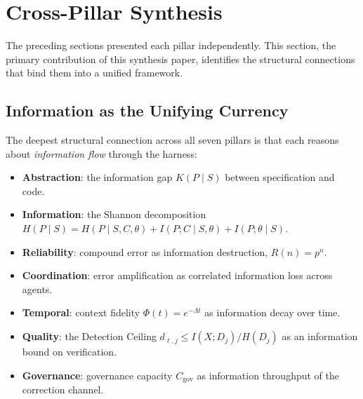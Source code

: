 

\section{Cross-Pillar Synthesis}
\label{sec:synthesis}

The preceding sections presented each pillar independently. This section, the primary contribution of this synthesis paper, identifies the structural connections that bind them into a unified framework.

\subsection{Information as the Unifying Currency}

The deepest structural connection across all seven pillars is that each reasons about \emph{information flow} through the harness:

\begin{itemize}[nosep]
    \item \textbf{Abstraction}: the information gap $K(P \mid S)$ between specification and code.
    \item \textbf{Information}: the Shannon decomposition $H(P \mid S) = H(P \mid S,C,\theta) + I(P;C \mid S,\theta) + I(P;\theta \mid S)$.
    \item \textbf{Reliability}: compound error as information destruction, $R(n) = p^n$.
    \item \textbf{Coordination}: error amplification as correlated information loss across agents.
    \item \textbf{Temporal}: context fidelity $\Phi(t) = e^{-\Lambda t}$ as information decay over time.
    \item \textbf{Quality}: the Detection Ceiling $d_{\ell,j} \leq I(X; D_j)/H(D_j)$ as an information bound on verification.
    \item \textbf{Governance}: governance capacity $C_{\text{gov}}$ as information throughput of the correction channel.
\end{itemize}

